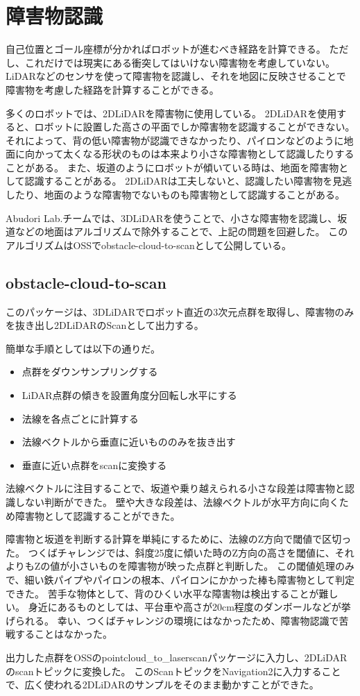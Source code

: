 \section{障害物認識}
自己位置とゴール座標が分かればロボットが進むべき経路を計算できる。
ただし、これだけでは現実にある衝突してはいけない障害物を考慮していない。
LiDARなどのセンサを使って障害物を認識し、それを地図に反映させることで障害物を考慮した経路を計算することができる。

多くのロボットでは、2DLiDARを障害物に使用している。
2DLiDARを使用すると、ロボットに設置した高さの平面でしか障害物を認識することができない。
それによって、背の低い障害物が認識できなかったり、パイロンなどのように地面に向かって太くなる形状のものは本来より小さな障害物として認識したりすることがある。
また、坂道のようにロボットが傾いている時は、地面を障害物として認識することがある。
2DLiDARは工夫しないと、認識したい障害物を見逃したり、地面のような障害物でないものも障害物として認識することがある。

Abudori Lab.チームでは、3DLiDARを使うことで、小さな障害物を認識し、坂道などの地面はアルゴリズムで除外することで、上記の問題を回避した。
このアルゴリズムはOSSでobstacle-cloud-to-scan\cite{obstacle}として公開している。

\subsection{obstacle-cloud-to-scan}
このパッケージは、3DLiDARでロボット直近の3次元点群を取得し、障害物のみを抜き出し2DLiDARのScanとして出力する。

簡単な手順としては以下の通りだ。
\begin{itemize}
    \item 点群をダウンサンプリングする
    \item LiDAR点群の傾きを設置角度分回転し水平にする
    \item 法線を各点ごとに計算する
    \item 法線ベクトルから垂直に近いもののみを抜き出す
    \item 垂直に近い点群をscanに変換する
\end{itemize}

法線ベクトルに注目することで、坂道や乗り越えられる小さな段差は障害物と認識しない判断ができた。
壁や大きな段差は、法線ベクトルが水平方向に向くため障害物として認識することができた。

障害物と坂道を判断する計算を単純にするために、法線のZ方向で閾値で区切った。
つくばチャレンジでは、斜度25度に傾いた時のZ方向の高さを閾値に、それよりもZの値が小さいものを障害物が映った点群と判断した。
この閾値処理のみで、細い鉄パイプやパイロンの根本、パイロンにかかった棒も障害物として判定できた。
苦手な物体として、背のひくい水平な障害物は検出することが難しい。
身近にあるものとしては、平台車や高さが20cm程度のダンボールなどが挙げられる。
幸い、つくばチャレンジの環境にはなかったため、障害物認識で苦戦することはなかった。

出力した点群をOSSのpointcloud\_to\_laserscan\cite{laserscan}パッケージに入力し、2DLiDARのscanトピックに変換した。
このScanトピックをNavigation2に入力することで、広く使われる2DLiDARのサンプルをそのまま動かすことができた。